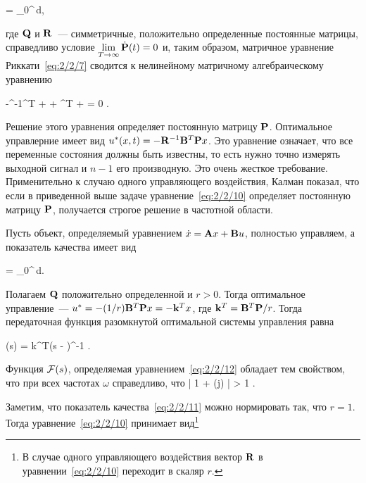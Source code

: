 \beqn
    \funcF =  \int\limits_0^\infty {}\,d\tau \mbox{,}
\eeqn

где $\mathbf{Q}$ и $\mathbf{R}$~--- симметричные, положительно определенные постоянные матрицы, справедливо условие $\lim\limits_{T \to \infty}\dot{\mathbf{P}}(t) = 0$ и, таким образом, матричное уравнение Риккати~\ref{eq:2/2/7} сводится к нелинейному матричному алгебраическому уравнению

    -^{-1}^T +  + ^T +  = 0 \mbox{.}
\eeq

Решение этого уравнения определяет постоянную матрицу $\mathbf{P}$. Оптимальное управлерние имеет вид $u^{*}(x, t) = -\mathbf{R}^{-1}\mathbf{B}^T\mathbf{P} x$. Это уравнение означает, что все переменные состояния должны быть известны, то есть нужно точно измерять выходной сигнал и $n-1$ его производную. Это очень жесткое требование. Применительно к случаю одного управляющего воздействия, Калман\cite{KALMAN2} показал, что если в приведенной выше задаче уравнение~\ref{eq:2/2/10} определяет постоянную матрицу $\mathbf{P}$, получается строгое решение в частотной области.

\br

Пусть объект, определяемый уравнением $\dot{x} = \mathbf{A}x + \mathbf{B} u$, полностью управляем, а показатель качества имеет вид

    \funcF =  \int\limits_0^\infty {}\,d\tau \mbox{.}
\eeq

Полагаем $\mathbf{Q}$ положительно определенной и $r > 0$. Тогда оптимальное управление~--- $u^{*} = -(1/r) \mathbf{B}^T\mathbf{P} x = -\mathbf{k}^Tx$, где $\mathbf{k}^T = \mathbf{B}^T\mathbf{P} / r$. Тогда передаточная функция разомкнутой оптимальной системы управления равна\cite{XU}

    \funcT(s) = k^T(s - )^{-1} \mbox{.}
\eeq

    Функция $\mathcal{F}(s)$, определяемая уравнением~\ref{eq:2/2/12} обладает тем свойством, что при всех частотах $\omega$ справедливо, что
    	\bigl| 1 + \funcT(j\omega) \bigr| > 1 \mbox{.}
	\eeq
\eteo


Заметим, что показатель качества~\ref{eq:2/2/11} можно нормировать так, что $r=1$. Тогда уравнение~\ref{eq:2/2/10} принимает вид\footnote{ В случае одного управляющего воздействия вектор $\mathbf{R}$ в уравнении~\ref{eq:2/2/10} переходит в скаляр $r$. }

